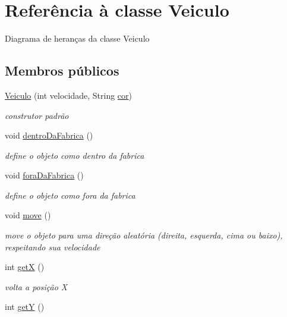 \hypertarget{class_veiculo}{}\section{Referência à classe Veiculo}
\label{class_veiculo}


Diagrama de heranças da classe Veiculo
\subsection*{Membros públicos}
\begin{DoxyCompactItemize}
\item 
\mbox{\hyperlink{class_veiculo_a6e43a5035741a90e4ef9d07b7fce6c87}{Veiculo}} (int velocidade, String \mbox{\hyperlink{class_veiculo_a6bc5886e61340672e69bd638936ec1d5}{cor}})
\begin{DoxyCompactList}\small\item\em construtor padrão \end{DoxyCompactList}\item 
void \mbox{\hyperlink{class_veiculo_a2bb3cf76255e4d6c33531daa82b1dfa7}{dentro\+Da\+Fabrica}} ()
\begin{DoxyCompactList}\small\item\em define o objeto como dentro da fabrica \end{DoxyCompactList}\item 
void \mbox{\hyperlink{class_veiculo_a72e8117111488e80a40e377327c361ea}{fora\+Da\+Fabrica}} ()
\begin{DoxyCompactList}\small\item\em define o objeto como fora da fabrica \end{DoxyCompactList}\item 
void \mbox{\hyperlink{class_veiculo_a3341b0ed6b4d34db990a31f7a499ae80}{move}} ()
\begin{DoxyCompactList}\small\item\em move o objeto para uma direção aleatória (direita, esquerda, cima ou baixo), respeitando sua velocidade \end{DoxyCompactList}\item 
int \mbox{\hyperlink{class_veiculo_a235b29e1e25ec8c769b20fb2aeba8404}{getX}} ()
\begin{DoxyCompactList}\small\item\em volta a posição X \end{DoxyCompactList}\item 
int \mbox{\hyperlink{class_veiculo_a06b2a923e51186673a016f75d10363d3}{getY}} ()

\end{DoxyCompactItemize}

